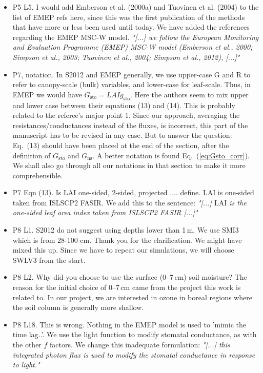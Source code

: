 \documentclass{scrartcl}
\begin{document}
\begin{itemize}
\item {\color{blue}P5 L5. I would add Emberson et al. (2000a) and Tuovinen et al. (2004) to
the list of EMEP refs here, since this was the first publication of the methods that
have more or less been used until today.}
  We have added the references regarding the EMEP MSC-W model. \emph{"[...] we follow the European Monitoring and Evaluation Programme (EMEP) MSC-W model (Emberson et al., 2000; Simpson et al., 2003; Tuovinen et al., 2004; Simpson et al., 2012), [...]"}
  
\item {\color{blue}P7, notation. In S2012 and EMEP generally, we use upper-case G and R to refer
to canopy-scale (bulk) variables, and lower-case for leaf-scale. Thus, in EMEP
we would have $G_\mathrm{sto} = LAI g_\mathrm{sto}$. Here the authors seem to mix upper and lower
case between their equations (13) and (14).}
  This is probably related to the referee's major point 1. Since our approach, averaging the resistances/conductances instead of the fluxes, is incorrect, this part of the manuscript has to be revised in any case. But to answer the question: Eq.~(13) should have been placed at the end of the section, after the definition of $G_\mathrm{sto}$ and $G_\mathrm{ns}$. A better notation is found Eq.~(\ref{eq:Gsto_corr}). We shall also go through all our notations in that section to make it more comprehensible.
  
\item {\color{blue}P7 Eqn (13). Is LAI one-sided, 2-sided, projected .... define.}
  LAI is one-sided taken from ISLSCP2 FASIR. We add this to the sentence: \emph{"[...] $\text{LAI}$ is the one-sided leaf area index taken from ISLSCP2 FASIR [...]"}
  
\item {\color{blue}P8 L1. S2012 do not suggest using depths lower than 1\,m. We use SMI3 which
  is from 28-100 cm.}
Thank you for the clarification. We might have mixed this up. Since we have to repeat our simulations, we will choose SWLV3 from the start.
  
\item {\color{blue}P8 L2. Why did you choose to use the surface (0--7\,cm) soil moisture?}
  The reason for the initial choice of 0--7\,cm came from the project this work is related to. In our project, we are interested in ozone in boreal regions where the soil column is generally more shallow. 
  
\item {\color{blue}P8 L18. This is wrong. Nothing in the EMEP model is used to ’mimic the
time lag..’. We use the light function to modify stomatal conductance, as with the
other $f$ factors.}
  We change this inadequate formulation: \emph{"[...] this integrated photon flux is used to modify the stomatal conductance in response to light."}
  

\end{itemize}
\end{document}

